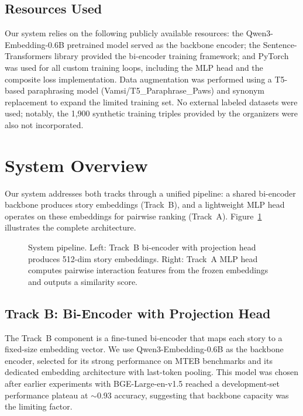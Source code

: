 \documentclass[11pt]{article}
\begin{document}
\subsection{Resources Used}

Our system relies on the following publicly available resources: the Qwen3-Embedding-0.6B pretrained model \cite{qwen3-embedding} served as the backbone encoder; the Sentence-Transformers library \cite{reimers-gurevych-2019} provided the bi-encoder training framework; and PyTorch was used for all custom training loops, including the MLP head and the composite loss implementation. Data augmentation was performed using a T5-based paraphrasing model (Vamsi/T5\_Paraphrase\_Paws) and synonym replacement to expand the limited training set. No external labeled datasets were used; notably, the 1,900 synthetic training triples provided by the organizers were also not incorporated.


\section{System Overview}

Our system addresses both tracks through a unified pipeline: a shared bi-encoder backbone produces story embeddings (Track~B), and a lightweight MLP head operates on these embeddings for pairwise ranking (Track~A). Figure~\ref{fig:pipeline} illustrates the complete architecture.

\begin{figure}[t!]
  \centering
  \caption{System pipeline. Left: Track~B bi-encoder with projection head produces 512-dim story embeddings. Right: Track~A MLP head computes pairwise interaction features from the frozen embeddings and outputs a similarity score.}
  \label{fig:pipeline}
\end{figure}


\subsection{Track B: Bi-Encoder with Projection Head}

The Track~B component is a fine-tuned bi-encoder that maps each story to a fixed-size embedding vector. We use Qwen3-Embedding-0.6B \cite{qwen3-embedding} as the backbone encoder, selected for its strong performance on MTEB benchmarks and its dedicated embedding architecture with last-token pooling. This model was chosen after earlier experiments with BGE-Large-en-v1.5 \cite{xiao-etal-2023-bge} reached a development-set performance plateau at $\sim$0.93 accuracy, suggesting that backbone capacity was the limiting factor.
\end{document}
